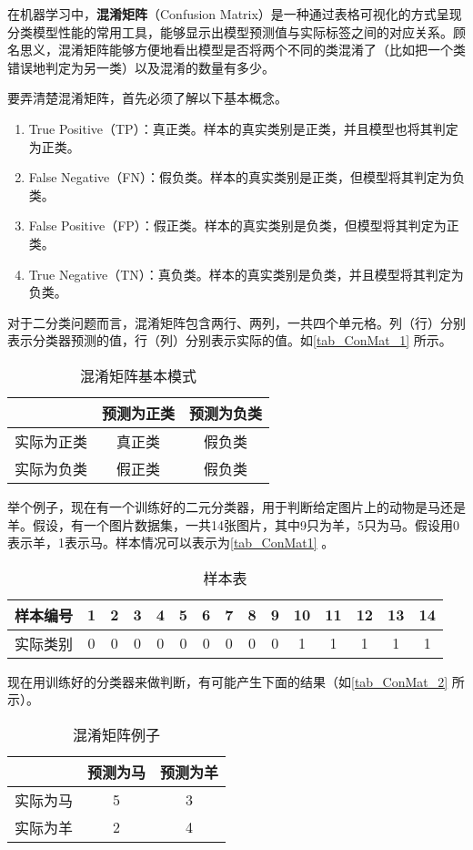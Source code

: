 

在机器学习中，\textbf{混淆矩阵}（Confusion Matrix）是一种通过表格可视化的方式呈现分类模型性能的常用工具，能够显示出模型预测值与实际标签之间的对应关系。顾名思义，混淆矩阵能够方便地看出模型是否将两个不同的类混淆了（比如把一个类错误地判定为另一类）以及混淆的数量有多少。

要弄清楚混淆矩阵，首先必须了解以下基本概念。

\begin{enumerate}
\item True Positive（TP）：真正类。样本的真实类别是正类，并且模型也将其判定为正类。
\item False Negative（FN）：假负类。样本的真实类别是正类，但模型将其判定为负类。
\item False Positive（FP）：假正类。样本的真实类别是负类，但模型将其判定为正类。
\item True Negative（TN）：真负类。样本的真实类别是负类，并且模型将其判定为负类。 
\end{enumerate}

对于二分类问题而言，混淆矩阵包含两行、两列，一共四个单元格。列（行）分别表示分类器预测的值，行（列）分别表示实际的值。如\autoref{tab_ConMat_1} 所示。

\begin{table}[ht]
\centering
\caption{混淆矩阵基本模式}\label{tab_ConMat_1}
\begin{tabular}{|c|c|c|}
\hline
 & 预测为正类 & 预测为负类 \\
\hline
实际为正类 & 真正类 & 假负类 \\
\hline
实际为负类 & 假正类 & 假负类 \\
\hline
\end{tabular}
\end{table}
举个例子，现在有一个训练好的二元分类器，用于判断给定图片上的动物是马还是羊。假设，有一个图片数据集，一共14张图片，其中9只为羊，5只为马。假设用0表示羊，1表示马。样本情况可以表示为\autoref{tab_ConMat1} 。

\begin{table}[ht]
\centering
\caption{样本表}\label{tab_ConMat1}
\begin{tabular}{|c|c|c|c|c|c|c|c|c|c|c|c|c|c|c|}
\hline
样本编号 & 1 & 2 & 3 & 4 & 5 & 6 & 7 & 8 & 9 & 10 & 11 & 12 & 13 & 14 \\
\hline
实际类别 & 0 & 0 & 0 & 0 & 0 & 0 & 0 & 0 & 0 & 1 & 1 & 1 & 1 & 1 \\
\hline
\end{tabular}
\end{table}

现在用训练好的分类器来做判断，有可能产生下面的结果（如\autoref{tab_ConMat_2} 所示）。
\begin{table}[ht]
\centering
\caption{混淆矩阵例子}\label{tab_ConMat_2}
\begin{tabular}{|c|c|c|}
\hline
 & 预测为马 & 预测为羊 \\
\hline
实际为马 & 5 & 3 \\
\hline
实际为羊 & 2 & 4 \\
\hline
\end{tabular}
\end{table}
